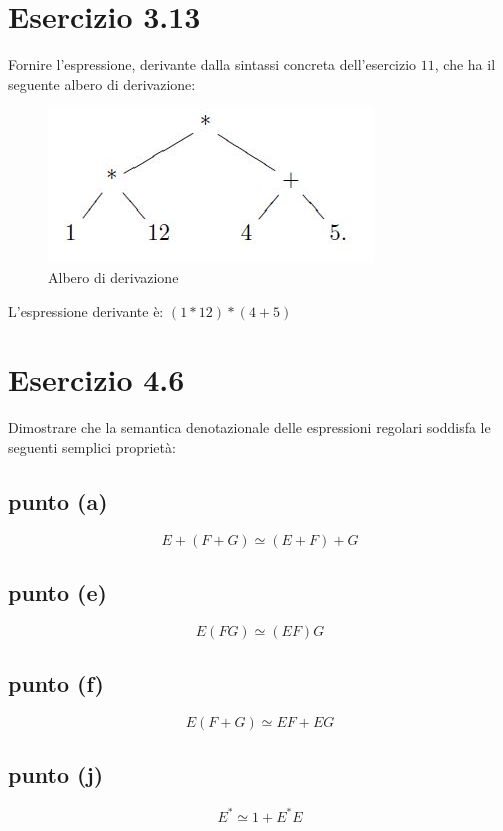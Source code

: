 	\section{Esercizio 3.13}
		Fornire l'espressione, derivante dalla sintassi concreta
		dell'esercizio $11$, che ha il seguente albero di derivazione:
		
		\begin{figure}[h]
			\centering
			\includegraphics[scale=0.5]{img/3-13}
			\caption{Albero di derivazione}
		\end{figure}
		
		\sectionline
		
		L'espressione derivante \`e: $(1*12)*(4+5)$
		
		\newpage
	
	\newpage \section{Esercizio 4.6}
		Dimostrare che la semantica denotazionale delle espressioni regolari
		soddisfa le seguenti semplici propriet\`a:
		\subsection{punto (a)}
			$$E+(F+G) \simeq (E+F)+G$$
		\subsection{punto (e)}
			$$E(FG) \simeq (EF)G$$
		\subsection{punto (f)}
			$$E(F+G) \simeq EF+EG$$
		\subsection{punto (j)}
			$$E^* \simeq 1+E^*E$$
			
		\sectionline
		
